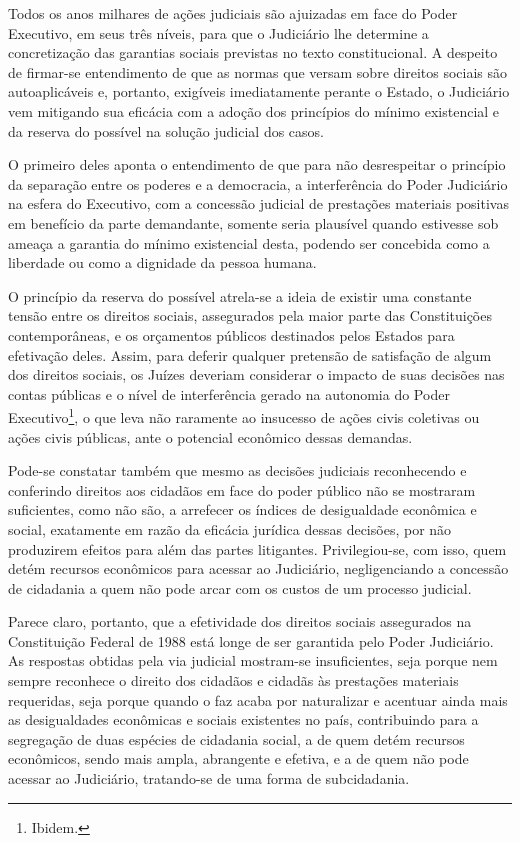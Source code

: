 Todos os anos milhares de ações judiciais são ajuizadas em face do Poder
Executivo, em seus três níveis, para que o Judiciário lhe determine a
concretização das garantias sociais previstas no texto constitucional. A
despeito de firmar-se entendimento de que as normas que versam sobre
direitos sociais são autoaplicáveis e, portanto, exigíveis imediatamente
perante o Estado, o Judiciário vem mitigando sua eficácia com a adoção
dos princípios do mínimo existencial e da reserva do possível na solução
judicial dos casos.

O primeiro deles aponta o entendimento de que para não desrespeitar o
princípio da separação entre os poderes e a democracia, a interferência
do Poder Judiciário na esfera do Executivo, com a concessão judicial de
prestações materiais positivas em benefício da parte demandante, somente
seria plausível quando estivesse sob ameaça a garantia do mínimo
existencial desta, podendo ser concebida como a liberdade ou como a
dignidade da pessoa humana.

O princípio da reserva do possível atrela-se a ideia de existir uma
constante tensão entre os direitos sociais, assegurados pela maior parte
das Constituições contemporâneas, e os orçamentos públicos destinados
pelos Estados para efetivação deles. Assim, para deferir qualquer
pretensão de satisfação de algum dos direitos sociais, os Juízes
deveriam considerar o impacto de suas decisões nas contas públicas e o
nível de interferência gerado na autonomia do Poder Executivo\footnote{Ibidem.},
o que leva não raramente ao insucesso de ações civis coletivas ou ações
civis públicas, ante o potencial econômico dessas demandas.

Pode-se constatar também que mesmo as decisões judiciais reconhecendo e
conferindo direitos aos cidadãos em face do poder público não se
mostraram suficientes, como não são, a arrefecer os índices de
desigualdade econômica e social, exatamente em razão da eficácia
jurídica dessas decisões, por não produzirem efeitos para além das
partes litigantes. Privilegiou-se, com isso, quem detém recursos
econômicos para acessar ao Judiciário, negligenciando a concessão de
cidadania a quem não pode arcar com os custos de um processo judicial.

Parece claro, portanto, que a efetividade dos direitos sociais
assegurados na Constituição Federal de 1988 está longe de ser garantida
pelo Poder Judiciário. As respostas obtidas pela via judicial mostram-se
insuficientes, seja porque nem sempre reconhece o direito dos cidadãos e
cidadãs às prestações materiais requeridas, seja porque quando o faz
acaba por naturalizar e acentuar ainda mais as desigualdades econômicas
e sociais existentes no país, contribuindo para a segregação de duas
espécies de cidadania social, a de quem detém recursos econômicos, sendo
mais ampla, abrangente e efetiva, e a de quem não pode acessar ao
Judiciário, tratando-se de uma forma de subcidadania.


